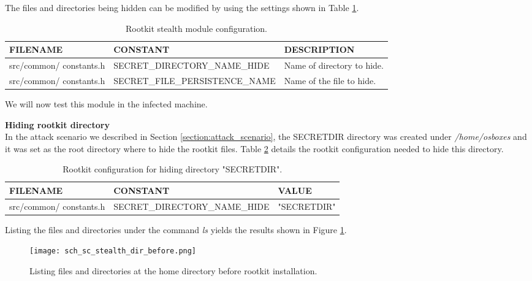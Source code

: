 The files and directories being hidden can be modified by using the settings shown in Table \ref{table:rootkit_stealth_config}.

\begin{table}[htbp]
\begin{tabular}{|>{\centering\arraybackslash}p{3cm}|>{\centering\arraybackslash}p{4.5cm}|>{\centering\arraybackslash}p{6cm}|}
\hline
\textbf{FILENAME} & \textbf{CONSTANT} & \textbf{DESCRIPTION}\\
\hline
\hline
src/common/ constants.h & SECRET\_DIRECTORY\_NAME\_HIDE & Name of directory to hide.\\
\hline
src/common/ constants.h & SECRET\_FILE\_PERSISTENCE\_NAME & Name of the file to hide.\\
\hline
\end{tabular}
\caption{Rootkit stealth module configuration.}
\label{table:rootkit_stealth_config}
\end{table}

We will now test this module in the infected machine.

\textbf{Hiding rootkit directory}\\
In the attack scenario we described in Section \ref{section:attack_scenario}, the SECRETDIR directory was created under \textit{/home/osboxes} and it was set as the root directory where to hide the rootkit files. Table \ref{table:rootkit_stealth_config_dir} details the rootkit configuration needed to hide this directory.

\begin{table}[htbp]
\begin{tabular}{|>{\centering\arraybackslash}p{3cm}|>{\centering\arraybackslash}p{4.5cm}|>{\centering\arraybackslash}p{6cm}|}
\hline
\textbf{FILENAME} & \textbf{CONSTANT} & \textbf{VALUE}\\
\hline
\hline
src/common/ constants.h & SECRET\_DIRECTORY\_NAME\_HIDE & "SECRETDIR"\\
\hline
\end{tabular}
\caption{Rootkit configuration for hiding directory "SECRETDIR".}
\label{table:rootkit_stealth_config_dir}
\end{table}

Listing the files and directories under the command \textit{ls} yields the results shown in Figure \ref{fig:sc_stealth_dir_before}.

\begin{figure}[htbp]
	\centering
	\texttt{[image: sch\_sc\_stealth\_dir\_before.png]}
	\caption{Listing files and directories at the home directory before rootkit installation.}
	\label{fig:sc_stealth_dir_before}
\end{figure}

